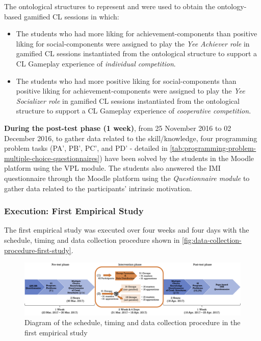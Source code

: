 The ontological structures to represent  and  were used to obtain the ontology-based gamified CL sessions in which:
\begin{itemize}
\item The students who had more liking for achievement-components than positive liking for social-components were assigned to play the \emph{Yee Achiever role} in gamified CL sessions instantiated from the ontological structure  to support a CL Gameplay experience of \emph{individual competition}.
\item The students who had more positive liking for social-components than positive liking for achievement-components were assigned to play the \emph{Yee Socializer role} in gamified CL sessions instantiated from the ontological structure  to support a CL Gameplay experience of \emph{cooperative competition}.
\end{itemize}

\textbf{During the post-test phase (1 week)}, from 25 November 2016 to 02 December 2016, to gather data related to the skill/knowledge, four programming problem tasks (PA', PB', PC', and PD' - detailed in \autoref{tab:programming-problem-multiple-choice-questionnaires}) have been solved by the students in the Moodle platform using the VPL module. The students also answered the IMI questionnaire through the Moodle platform using the \emph{Questionnaire module} to gather data related to the participants' intrinsic motivation.

\subsubsection{Execution: First Empirical Study}

The first empirical study was executed over four weeks and four days with the schedule, timing and data collection procedure shown in \autoref{fig:data-collection-procedure-first-study}.

\begin{figure}[htb]
 \caption{Diagram of the schedule, timing and data collection procedure in the first empirical study}
 \label{fig:data-collection-procedure-first-study}
 \centering
 \includegraphics[width=1\textwidth]{images/chap-evaluation/data-collection-procedure-first-study.png}
 \fautor
\end{figure}

